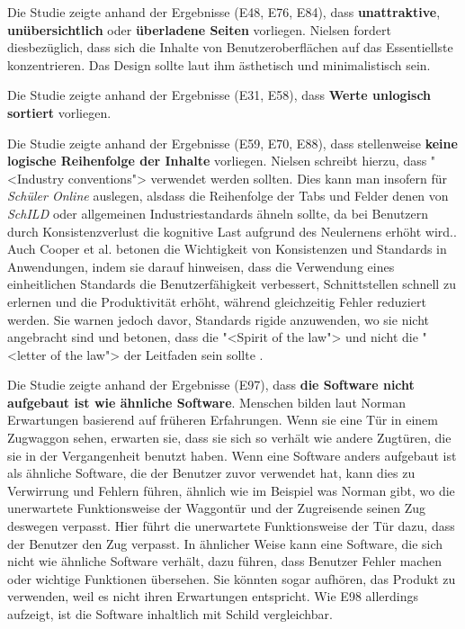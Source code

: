 Die Studie zeigte anhand der Ergebnisse (E48, E76, E84), dass \textbf{unattraktive}, \textbf{unübersichtlich} oder \textbf{überladene Seiten} vorliegen. Nielsen fordert diesbezüglich, dass sich die Inhalte von Benutzeroberflächen auf das Essentiellste konzentrieren. Das Design sollte laut ihm ästhetisch und minimalistisch sein. \cite{Nielsen10}

Die Studie zeigte anhand der Ergebnisse (E31, E58), dass \textbf{Werte unlogisch sortiert} vorliegen.

Die Studie zeigte anhand der Ergebnisse (E59, E70, E88), dass stellenweise \textbf{keine logische Reihenfolge der Inhalte} vorliegen. Nielsen schreibt hierzu, dass "<Industry conventions"> verwendet werden sollten.\cite{Nielsen10} Dies kann man insofern für \textit{Schüler Online} auslegen, alsdass die Reihenfolge der Tabs und Felder denen von \textit{SchILD} oder allgemeinen Industriestandards ähneln sollte, da bei Benutzern durch Konsistenzverlust die kognitive Last aufgrund des Neulernens erhöht wird.\cite{Nielsen10}. Auch Cooper et al. betonen die Wichtigkeit von Konsistenzen und Standards in Anwendungen, indem sie darauf hinweisen, dass die Verwendung eines einheitlichen Standards die Benutzerfähigkeit verbessert, Schnittstellen schnell zu erlernen und die Produktivität erhöht, während gleichzeitig Fehler reduziert werden. Sie warnen jedoch davor, Standards rigide anzuwenden, wo sie nicht angebracht sind und betonen, dass die "<Spirit of the law"> und nicht die "<letter of the law"> der Leitfaden sein sollte \cite{CooperReimannEtAl14}.

Die Studie zeigte anhand der Ergebnisse (E97), dass \textbf{die Software nicht aufgebaut ist wie ähnliche Software}. Menschen bilden laut Norman Erwartungen basierend auf früheren Erfahrungen. Wenn sie eine Tür in einem Zugwaggon sehen, erwarten sie, dass sie sich so verhält wie andere Zugtüren, die sie in der Vergangenheit benutzt haben. Wenn eine Software anders aufgebaut ist als ähnliche Software, die der Benutzer zuvor verwendet hat, kann dies zu Verwirrung und Fehlern führen, ähnlich wie im Beispiel was Norman gibt, wo die unerwartete Funktionsweise der Waggontür und der Zugreisende seinen Zug deswegen verpasst. Hier führt die unerwartete Funktionsweise der Tür dazu, dass der Benutzer den Zug verpasst.\cite{Norman} In ähnlicher Weise kann eine Software, die sich nicht wie ähnliche Software verhält, dazu führen, dass Benutzer Fehler machen oder wichtige Funktionen übersehen. Sie könnten sogar aufhören, das Produkt zu verwenden, weil es nicht ihren Erwartungen entspricht. Wie E98 allerdings aufzeigt, ist die Software inhaltlich mit Schild vergleichbar.

